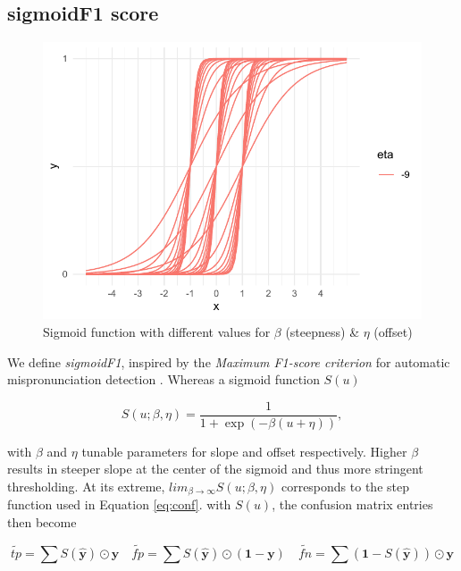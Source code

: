 \subsection{sigmoidF1 score}
\label{sec:orgc5d29d7}


\begin{figure}[htbp]
\centering
\includegraphics[width=.9\linewidth]{./images/sigmoid.pdf}
\caption{\label{fig:sigmoid}
Sigmoid function with different values for $\beta$ (steepness) \& $\eta$ (offset)}
\end{figure}

We define \emph{sigmoidF1}, inspired by the \emph{Maximum F1-score criterion} for automatic mispronunciation detection \cite{sigmoid}. Whereas a sigmoid function \(S(u)\)

\begin{equation}
S(u; \beta, \eta)=\frac{1}{1+\exp (-\beta (u + \eta))},
\end{equation}

with \(\beta\) and \(\eta\) tunable parameters for slope and offset respectively. Higher \(\beta\) results in steeper slope at the center of the sigmoid and thus more stringent thresholding. At its extreme, \(lim_{\beta\to\infty} S(u; \beta, \eta)\) corresponds to the step function used in Equation \ref{eq:conf}. with \(S(u)\), the confusion matrix entries then become

\begin{equation}\label{eq:sigmoidF1}
\widetilde{tp}=\sum S(\hat{\mathbf{y}}) \odot \mathbf{y} \quad\widetilde{fp}= \sum S(\hat{\mathbf{y}}) \odot (\mathbf{1} - \mathbf{y}) \quad \widetilde{f n}= \sum (\mathbf{1} - S(\hat{\mathbf{y}})) \odot \mathbf{y}
\end{equation}

